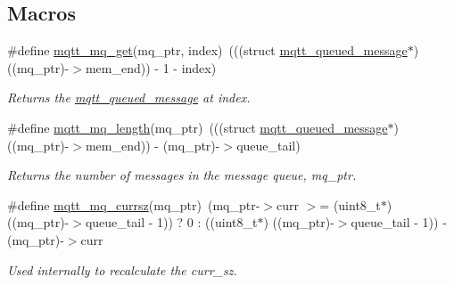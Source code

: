 \subsection*{Macros}
\begin{DoxyCompactItemize}
\item 
\#define \hyperlink{group__details_gadfa141880e5b30429bd89018da0c8d94}{mqtt\+\_\+mq\+\_\+get}(mq\+\_\+ptr,  index)~(((struct \hyperlink{structmqtt__queued__message}{mqtt\+\_\+queued\+\_\+message}$\ast$) ((mq\+\_\+ptr)-\/$>$mem\+\_\+end)) -\/ 1 -\/ index)
\begin{DoxyCompactList}\small\item\em Returns the \hyperlink{structmqtt__queued__message}{mqtt\+\_\+queued\+\_\+message} at {\ttfamily index}. \end{DoxyCompactList}\item 
\#define \hyperlink{group__details_ga4be078d9d0bd6183b9082f3217622223}{mqtt\+\_\+mq\+\_\+length}(mq\+\_\+ptr)~(((struct \hyperlink{structmqtt__queued__message}{mqtt\+\_\+queued\+\_\+message}$\ast$) ((mq\+\_\+ptr)-\/$>$mem\+\_\+end)) -\/ (mq\+\_\+ptr)-\/$>$queue\+\_\+tail)\hypertarget{group__details_ga4be078d9d0bd6183b9082f3217622223}{}\label{group__details_ga4be078d9d0bd6183b9082f3217622223}

\begin{DoxyCompactList}\small\item\em Returns the number of messages in the message queue, {\ttfamily mq\+\_\+ptr}. \end{DoxyCompactList}\item 
\#define \hyperlink{group__details_ga8cd873da2116975ce39b313f93068d83}{mqtt\+\_\+mq\+\_\+currsz}(mq\+\_\+ptr)~(mq\+\_\+ptr-\/$>$curr $>$= (uint8\+\_\+t$\ast$) ((mq\+\_\+ptr)-\/$>$queue\+\_\+tail -\/ 1)) ? 0 \+: ((uint8\+\_\+t$\ast$) ((mq\+\_\+ptr)-\/$>$queue\+\_\+tail -\/ 1)) -\/ (mq\+\_\+ptr)-\/$>$curr\hypertarget{group__details_ga8cd873da2116975ce39b313f93068d83}{}\label{group__details_ga8cd873da2116975ce39b313f93068d83}

\begin{DoxyCompactList}\small\item\em Used internally to recalculate the {\ttfamily curr\+\_\+sz}. \end{DoxyCompactList}\end{DoxyCompactItemize}
